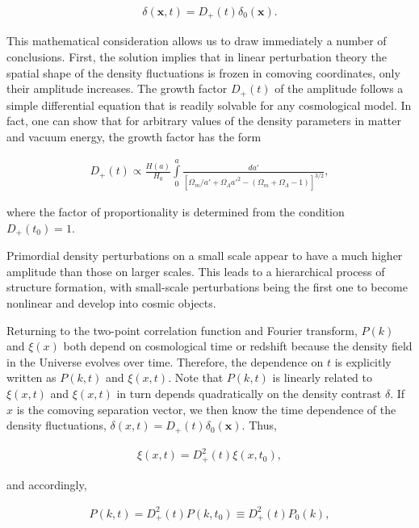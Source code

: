 \documentclass[a4paper,11pt]{article}
\begin{document}
\begin{align*}
    \delta(\mathbf{x},t) = D_+(t)\delta_0(\mathbf{x}).
\end{align*}

{\noindent}This mathematical consideration allows us to draw immediately a number of conclusions. First, the solution implies that in linear perturbation theory the spatial shape of the density fluctuations is frozen in comoving coordinates, only their amplitude increases. The growth factor $D_+(t)$ of the amplitude follows a simple differential equation that is readily solvable for any cosmological model. In fact, one can show that for arbitrary values of the density parameters in matter and vacuum energy, the growth factor has the form

\begin{align*}
    D_+(t) \propto \frac{H(a)}{H_0}\int\limits_0^a \frac{da'}{[\Omega_m/a'+\Omega_\Lambda a'^2-(\Omega_m+\Omega_\Lambda-1)]^{3/2}},
\end{align*}

{\noindent}where the factor of proportionality is determined from the condition $D_+(t_0)=1$.

{\noindent}Primordial density perturbations on a small scale appear to have a much higher amplitude than those on larger scales. This leads to a hierarchical process of structure formation, with small-scale perturbations being the first one to become nonlinear and develop into cosmic objects.

{\noindent}Returning to the two-point correlation function and Fourier transform, $P(k)$ and $\xi(x)$ both depend on cosmological time or redshift because the density field in the Universe evolves over time. Therefore, the dependence on $t$ is explicitly written as $P(k,t)$ and $\xi(x,t)$. Note that $P(k,t)$ is linearly related to $\xi(x,t)$ and $\xi(x,t)$ in turn depends quadratically on the density contrast $\delta$. If $x$ is the comoving separation vector, we then know the time dependence of the density fluctuations, $\delta(x,t)=D_+(t)\delta_0(\mathbf{x})$. Thus,

\begin{align*}
    \xi(x,t) = D_+^2(t)\xi(x,t_0),
\end{align*}

{\noindent}and accordingly,

\begin{align*}
    P(k,t) = D_+^2(t)P(k,t_0) \equiv D_+^2(t)P_0(k),
\end{align*}
\end{document}
